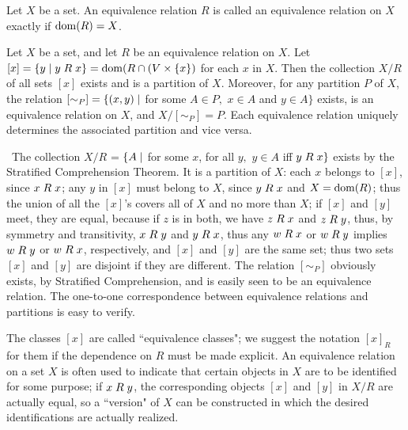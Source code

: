 \begin{definition}
 Let $X$ be a set.  An equivalence relation $R$ is called an
 {\upshape equivalence relation on $X$} exactly if $\mathop{\mathrm{dom}}(R) = X$.
\end{definition}

\begin{thm}
 Let $X$ be a set, and let $R$ be an equivalence relation on $X$.
 Let $[x] = \{y \mid y \mathrel{R} x\} = \mathop{\mathrm{dom}}(R \cap (V \times \{x\})$ for
 each $x$ in  $X$.  Then the collection $X/R$ of all sets $[x]$ exists and is a
 partition of $X$.
 Moreover, for any partition $P$ of $X$, the relation $[\sim_P] = \{(x,y) \mid$
 for some $A \in P,$ $ x \in A$ and $y \in A\}$ exists, is an equivalence
 relation on $X$, and\linebreak
 $X/[\sim_P] = P$.  Each equivalence relation uniquely
 determines the associated partition and vice versa.
\end{thm}

\preuve\ The collection $X/R$ = $\{A \mid$ for some $x$, for all
$y,$ $ y \in A$ iff $y \mathrel{R} x\}$ exists by the Stratified Comprehension
Theorem.  It is a
partition of $X$: each $x$ belongs to $[x]$, since $x
\mathrel{R} x$; any $y$ in $[x]$ must belong to $X$, since $y \mathrel{R} x$ and $X =
\mathop{\mathrm{dom}}(R)$; thus the union of all the $[x]$'s covers all of $X$ and no
more than $X$; if $[x]$ and $[y]$ meet, they are equal, because if $z$
is in both, we have $z \mathrel{R} x$ and $z \mathrel{R} y$, thus, by symmetry and
transitivity, $x \mathrel{R} y$ and $y \mathrel{R} x$, thus any $w \mathrel{R} x$ or $w \mathrel{R} y$ implies
$w \mathrel{R} y$ or $w \mathrel{R} x$, respectively, and $[x]$ and $[y]$ are the same
set; thus two sets $[x]$ and $[y]$ are disjoint if
they are different.  The relation $[\sim_P]$ obviously exists, by
Stratified Comprehension, and
is easily seen to be an equivalence relation.  The one-to-one
correspondence between equivalence relations and partitions is easy to
verify.
\finpreuve

The classes $[x]$ are called ``equivalence classes"; we suggest 
the notation $[x]_R$ for them if the dependence on $R$ must be made
explicit.  An equivalence relation on a set $X$ is often used to
indicate that certain objects in $X$ are to be identified for some
purpose; if $x \mathrel{R} y$, the corresponding objects $[x]$ and $[y]$ in $X/R$ are
actually equal, so a ``version" of $X$ can be constructed in which the
desired identifications are actually realized.

